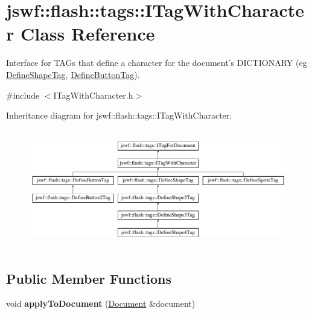 \hypertarget{classjswf_1_1flash_1_1tags_1_1_i_tag_with_character}{\section{jswf\+:\+:flash\+:\+:tags\+:\+:I\+Tag\+With\+Character Class Reference}
\label{classjswf_1_1flash_1_1tags_1_1_i_tag_with_character}
}


Interface for {\ttfamily T\+A\+G}s that define a character for the document's {\ttfamily D\+I\+C\+T\+I\+O\+N\+A\+R\+Y} (eg \hyperlink{classjswf_1_1flash_1_1tags_1_1_define_shape_tag}{Define\+Shape\+Tag}, \hyperlink{classjswf_1_1flash_1_1tags_1_1_define_button_tag}{Define\+Button\+Tag}).  




{\ttfamily \#include $<$I\+Tag\+With\+Character.\+h$>$}

Inheritance diagram for jswf\+:\+:flash\+:\+:tags\+:\+:I\+Tag\+With\+Character\+:\begin{figure}[H]
\begin{center}
\leavevmode
\includegraphics[height=5.209302cm]{classjswf_1_1flash_1_1tags_1_1_i_tag_with_character}
\end{center}
\end{figure}
\subsection*{Public Member Functions}
\begin{DoxyCompactItemize}
\item 
\hypertarget{classjswf_1_1flash_1_1tags_1_1_i_tag_with_character_ac57e712453786b97a9f91f3682573394}{void {\bfseries apply\+To\+Document} (\hyperlink{classjswf_1_1flash_1_1_document}{Document} \&document)}\label{classjswf_1_1flash_1_1tags_1_1_i_tag_with_character_ac57e712453786b97a9f91f3682573394}

\end{DoxyCompactItemize}

